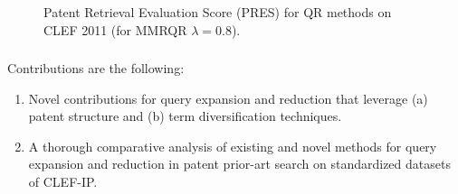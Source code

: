 \documentclass[xcolor=x11names,compress]{beamer}
\renewcommand{\(}{\begin{columns}}
\renewcommand{\)}{\end{columns}}
\newcommand{\<}[1]{\begin{column}{#1}}
\renewcommand{\>}{\end{column}}
\begin{document}
\begin{frame}
\begin{figure}
\begin{centering}
\par\end{centering}

\caption{Patent Retrieval Evaluation Score (PRES) for QR methods on CLEF 2011
(for MMRQR $\lambda=0.8$).}
\label{fig:QR-MAP-CLEF-IP2011}
\end{figure}

\end{frame}


\begin{frame}
\frametitle{}

Contributions are the following: 
\begin{enumerate}
\item Novel contributions for query expansion and reduction that leverage
(a) patent structure and (b) term diversification techniques. 
\item A thorough comparative analysis of existing and novel methods for
query expansion and reduction in patent prior-art search on standardized
datasets of CLEF-IP. 
\end{enumerate}
\end{frame}


\begin{frame}
\frametitle{}
\end{frame}

%
% 
\end{document}
